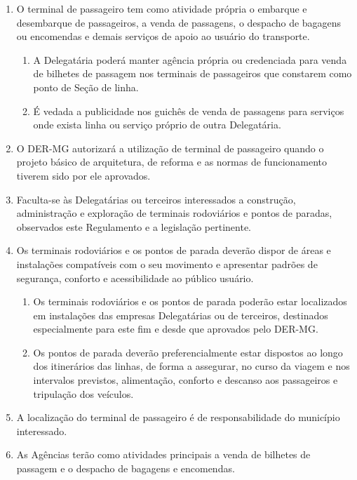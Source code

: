 \begin{enumerate}[resume, label=Art. \arabic*]

\item O terminal de passageiro tem como atividade própria o embarque e desembarque de passageiros, a venda de passagens, o despacho de bagagens ou encomendas e demais serviços de apoio ao usuário do transporte.

\begin{enumerate}[label= \S \arabic*] %

\item A Delegatária poderá manter agência própria ou credenciada para venda de bilhetes de passagem nos terminais de passageiros que constarem como ponto de Seção de linha.

\item É vedada a publicidade nos guichês de venda de passagens para serviços onde exista linha ou serviço próprio de outra Delegatária.

\end{enumerate}

\item O DER-MG autorizará a utilização de terminal de passageiro quando o projeto básico de arquitetura, de reforma e as normas de funcionamento tiverem sido por ele aprovados.

\item Faculta-se às Delegatárias ou terceiros interessados a construção, administração e exploração de terminais rodoviários e pontos de paradas, observados este Regulamento e a legislação pertinente.

\item Os terminais rodoviários e os pontos de parada deverão dispor de áreas e instalações compatíveis com o seu movimento e apresentar padrões de segurança, conforto e acessibilidade ao público usuário.

\begin{enumerate}[label= \S \arabic*] %

\item Os terminais rodoviários e os pontos de parada poderão estar localizados em instalações das empresas Delegatárias ou de terceiros, destinados especialmente para este fim e desde que aprovados pelo DER-MG.

\item Os pontos de parada deverão preferencialmente estar dispostos ao longo dos itinerários das linhas, de forma a assegurar, no curso da viagem e nos intervalos previstos, alimentação, conforto e descanso aos passageiros e tripulação dos veículos.

\end{enumerate}

\item A localização do terminal de passageiro é de responsabilidade do município interessado.


\item As Agências terão como atividades principais a venda de bilhetes de passagem e o despacho de bagagens e encomendas.

\end{enumerate}










